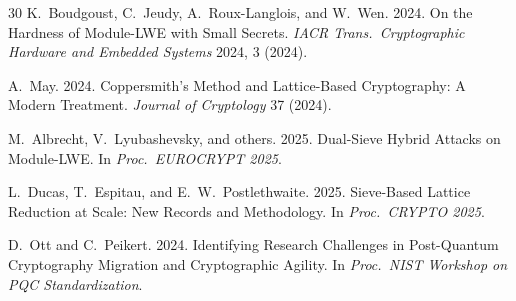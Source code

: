 \documentclass[sigconf,nonacm]{acmart}
\begin{document}
\begin{thebibliography}{30}
K.~Boudgoust, C.~Jeudy, A.~Roux-Langlois, and W.~Wen. 2024.
On the Hardness of Module-LWE with Small Secrets.
\textit{IACR Trans.\ Cryptographic Hardware and Embedded Systems}
2024, 3 (2024).

A.~May. 2024. Coppersmith's Method and Lattice-Based Cryptography:
A Modern Treatment. \textit{Journal of Cryptology} 37 (2024).

M.~Albrecht, V.~Lyubashevsky, and others. 2025. Dual-Sieve Hybrid
Attacks on Module-LWE. In \textit{Proc.\ EUROCRYPT 2025}.

L.~Ducas, T.~Espitau, and E.~W.~Postlethwaite. 2025. Sieve-Based
Lattice Reduction at Scale: New Records and Methodology.
In \textit{Proc.\ CRYPTO 2025}.

D.~Ott and C.~Peikert. 2024. Identifying Research Challenges in
Post-Quantum Cryptography Migration and Cryptographic Agility.
In \textit{Proc.\ NIST Workshop on PQC Standardization}.

\end{thebibliography}
\end{document}

